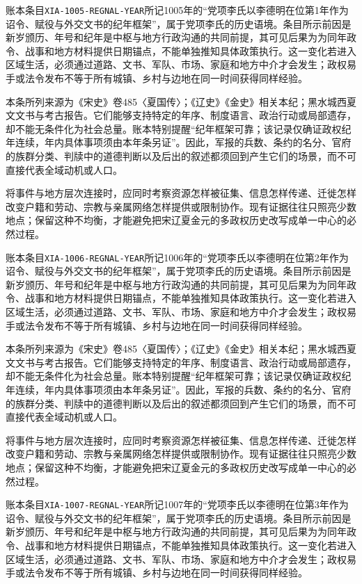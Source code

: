 账本条目\texttt{XIA-1005-REGNAL-YEAR}所记1005年的“党项李氏以李德明在位第1年作为诏令、赋役与外交文书的纪年框架”，属于党项李氏的历史语境。条目所示前因是新岁颁历、年号和纪年是中枢与地方行政沟通的共同前提，其可见后果为为同年政令、战事和地方材料提供日期锚点，不能单独推知具体政策执行。这一变化若进入区域生活，必须通过道路、文书、军队、市场、家庭和地方中介才会发生；政权易手或法令发布不等于所有城镇、乡村与边地在同一时间获得同样经验。

本条所列来源为《宋史》卷485〈夏国传〉；《辽史》《金史》相关本纪；黑水城西夏文文书与考古报告。它们能够支持特定的年序、制度语言、政治行动或局部遗存，却不能无条件化为社会总量。账本特别提醒“纪年框架可靠；该记录仅确证政权纪年连续，年内具体事项须由本年条另证”。因此，军报的兵数、条约的名分、官府的族群分类、判牍中的道德判断以及后出的叙述都须回到产生它们的场景，而不可直接代表全域动机或人口。

将事件与地方层次连接时，应同时考察资源怎样被征集、信息怎样传递、迁徙怎样改变户籍和劳动、宗教与亲属网络怎样提供或限制协作。现有证据往往只照亮少数地点；保留这种不均衡，才能避免把宋辽夏金元的多政权历史改写成单一中心的必然过程。

账本条目\texttt{XIA-1006-REGNAL-YEAR}所记1006年的“党项李氏以李德明在位第2年作为诏令、赋役与外交文书的纪年框架”，属于党项李氏的历史语境。条目所示前因是新岁颁历、年号和纪年是中枢与地方行政沟通的共同前提，其可见后果为为同年政令、战事和地方材料提供日期锚点，不能单独推知具体政策执行。这一变化若进入区域生活，必须通过道路、文书、军队、市场、家庭和地方中介才会发生；政权易手或法令发布不等于所有城镇、乡村与边地在同一时间获得同样经验。

本条所列来源为《宋史》卷485〈夏国传〉；《辽史》《金史》相关本纪；黑水城西夏文文书与考古报告。它们能够支持特定的年序、制度语言、政治行动或局部遗存，却不能无条件化为社会总量。账本特别提醒“纪年框架可靠；该记录仅确证政权纪年连续，年内具体事项须由本年条另证”。因此，军报的兵数、条约的名分、官府的族群分类、判牍中的道德判断以及后出的叙述都须回到产生它们的场景，而不可直接代表全域动机或人口。

将事件与地方层次连接时，应同时考察资源怎样被征集、信息怎样传递、迁徙怎样改变户籍和劳动、宗教与亲属网络怎样提供或限制协作。现有证据往往只照亮少数地点；保留这种不均衡，才能避免把宋辽夏金元的多政权历史改写成单一中心的必然过程。

账本条目\texttt{XIA-1007-REGNAL-YEAR}所记1007年的“党项李氏以李德明在位第3年作为诏令、赋役与外交文书的纪年框架”，属于党项李氏的历史语境。条目所示前因是新岁颁历、年号和纪年是中枢与地方行政沟通的共同前提，其可见后果为为同年政令、战事和地方材料提供日期锚点，不能单独推知具体政策执行。这一变化若进入区域生活，必须通过道路、文书、军队、市场、家庭和地方中介才会发生；政权易手或法令发布不等于所有城镇、乡村与边地在同一时间获得同样经验。

